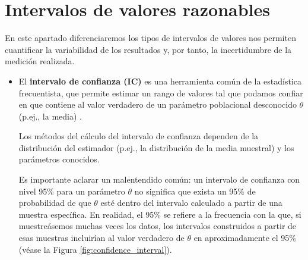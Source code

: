 \chapter{Intervalos de valores razonables}
\label{chap:intervalos_valores_razonables}

En este apartado diferenciaremos los tipos de intervalos de valores nos permiten cuantificar la variabilidad de los resultados y, por tanto, la incertidumbre de la medición realizada. 

\begin{itemize}

    \item El \textbf{intervalo de confianza (IC)} es una herramienta común de la estadística frecuentista, que permite estimar un rango de valores tal que podamos confiar en que contiene al valor verdadero de un parámetro poblacional desconocido $\theta$ (p.ej., la media) \cite{berrendero2025}.

    Los métodos del cálculo del intervalo de confianza dependen de la distribución del estimador (p.ej., la distribución de la media muestral) y los parámetros conocidos. 

    Es importante aclarar un malentendido común: un intervalo de confianza con nivel 95\% para un parámetro $\theta$ no significa que exista un 95\% de probabilidad de que $\theta$ esté dentro del intervalo calculado a partir de una muestra específica. En realidad, el 95\% se refiere a la frecuencia con la que, si muestreásemos muchas veces los datos, los intervalos construidos a partir de esas muestras incluirían al valor verdadero de $\theta$ en aproximadamente el 95\% \cite{murphy2022} (véase la Figura \ref{fig:confidence_interval}).


\end{itemize}
